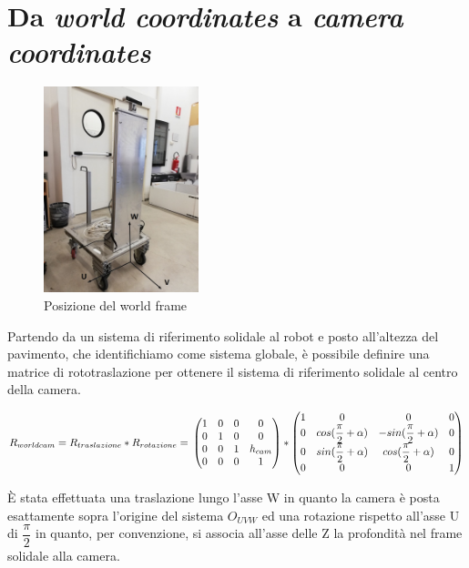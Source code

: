 \section{Da \textit{world coordinates} a \textit{camera coordinates}}
\begin{figure}[H]
	\centering
	\includegraphics[width=0.4\textwidth]{Immagini/SupportoCamera_asse1.jpg}
	\caption{Posizione del world frame}
	\label{fig:worldframe}
\end{figure}

Partendo da un sistema di riferimento solidale al robot e posto all'altezza del pavimento, che identifichiamo come sistema globale, è possibile definire una matrice di rototraslazione per ottenere il sistema di riferimento solidale al centro della camera.

\begin{equation*}
R_{worldcam} = R_{traslazione} * R_{rotazione} =\\
\begin{pmatrix}
1 & 0 & 0 & 0 \\
0 & 1 & 0 & 0 \\
0 & 0 & 1 & h_{cam} \\
0 & 0 & 0 & 1 \\
\end{pmatrix} *
\begin{pmatrix}
1 & 0 & 0 & 0 \\
0 & cos(\dfrac{\pi}{2}+\alpha) & -sin(\dfrac{\pi}{2}+\alpha) & 0 \\
0 & sin(\dfrac{\pi}{2}+\alpha) & cos(\dfrac{\pi}{2}+\alpha) & 0 \\
0 & 0 & 0 & 1 \\
\end{pmatrix}
\end{equation*}

È stata effettuata una traslazione lungo l'asse W in quanto la camera è posta esattamente sopra l'origine del sistema $O_{UVW}$ ed una rotazione rispetto all'asse U di $ \dfrac{\pi}{2}$ in quanto, per convenzione, si associa all'asse delle Z la profondità nel frame solidale alla camera.

